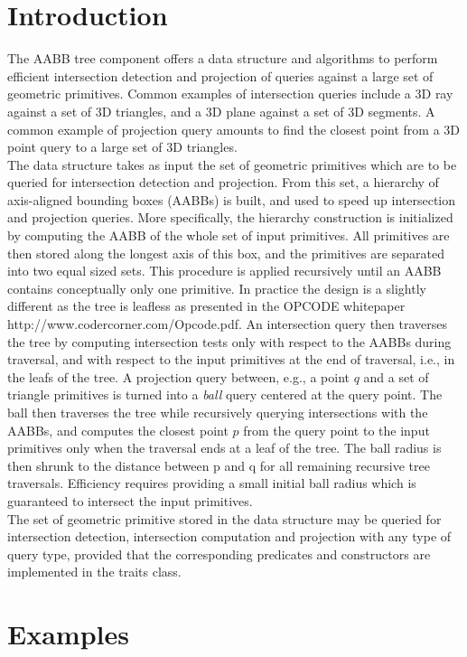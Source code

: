 \section{Introduction}

\label{AABB_tree_section_intro}

The AABB tree component offers a data structure and algorithms to perform efficient intersection detection and projection of queries against a large set of geometric primitives. Common examples of intersection queries include a 3D ray against a set of 3D triangles, and a 3D plane against a set of 3D segments. A common example of projection query amounts to find the closest point from a 3D point query to a large set of 3D triangles.\\

The data structure takes as input the set of geometric primitives
which are to be queried for intersection detection and projection.
From this set, a hierarchy of axis-aligned bounding boxes (AABBs) is built, and used to speed up intersection and projection queries. More specifically, the hierarchy construction is initialized by computing the AABB of the whole set of input primitives. All primitives are then stored along the longest axis of this box, and the primitives are separated into two equal sized sets. This procedure is applied recursively until an AABB contains conceptually only one primitive. In practice the design is a slightly different as the tree is leafless as presented in the OPCODE whitepaper http://www.codercorner.com/Opcode.pdf. An intersection query then traverses the tree by computing intersection tests only with respect to the AABBs during traversal, and with respect to the input primitives at the end of traversal, i.e., in the leafs of the tree. A projection query between, e.g., a point $q$ and a set of triangle primitives is turned into a  \emph{ball} query centered at the query point. The ball then traverses the tree while recursively querying intersections with the AABBs, and computes the closest point $p$ from the query point to the input primitives only when the traversal ends at a leaf of the tree. The ball radius is then shrunk to the distance between p and q for all remaining recursive tree traversals. Efficiency requires providing a small initial ball radius which is guaranteed to intersect the input primitives.\\

The set of geometric primitive stored in the data structure
may be queried for intersection detection, intersection computation
and projection with any type of query type, provided that the corresponding predicates and constructors are implemented in the traits class. 



\section{Examples}
\label{AABB_tree_section_examples}


